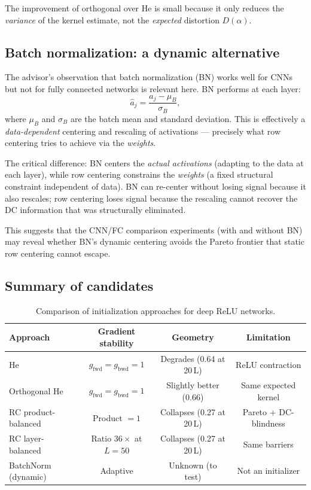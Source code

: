 \documentclass[11pt,a4paper]{article}
\theoremstyle{definition}
\begin{document}
The improvement of orthogonal over He is small because it only reduces
the \emph{variance} of the kernel estimate, not the \emph{expected}
distortion $D(\alpha)$.

\subsection{Batch normalization: a dynamic alternative}

The advisor's observation that batch normalization (BN) works well for
CNNs but not for fully connected networks is relevant here.  BN performs
at each layer:
\[
  \hat{a}_j = \frac{a_j - \mu_B}{\sigma_B},
\]
where $\mu_B$ and $\sigma_B$ are the batch mean and standard deviation.
This is effectively a \emph{data-dependent} centering and rescaling of
activations --- precisely what row centering tries to achieve via the
\emph{weights}.

The critical difference: BN centers the \emph{actual activations}
(adapting to the data at each layer), while row centering constrains
the \emph{weights} (a fixed structural constraint independent of data).
BN can re-center without losing signal because it also rescales;
row centering loses signal because the rescaling cannot recover the
DC information that was structurally eliminated.

This suggests that the CNN/FC comparison experiments (with and without BN)
may reveal whether BN's dynamic centering avoids the Pareto frontier
that static row centering cannot escape.

\subsection{Summary of candidates}

\begin{table}[H]
\centering
\caption{Comparison of initialization approaches for deep ReLU networks.}
\label{tab:candidates}
\begin{tabular}{l c c c}
\toprule
Approach & Gradient stability & Geometry & Limitation \\
\midrule
He                    & $g_{\mathrm{fwd}} = g_{\mathrm{bwd}} = 1$ & Degrades (0.64 at 20\,L) & ReLU contraction \\
Orthogonal He         & $g_{\mathrm{fwd}} = g_{\mathrm{bwd}} = 1$ & Slightly better (0.66)    & Same expected kernel \\
RC product-balanced   & Product $= 1$                              & Collapses (0.27 at 20\,L) & Pareto + DC-blindness \\
RC layer-balanced     & Ratio $36\times$ at $L\!=\!50$             & Collapses (0.27 at 20\,L) & Same barriers \\
BatchNorm (dynamic)   & Adaptive                                   & Unknown (to test)         & Not an initializer \\
\bottomrule
\end{tabular}
\end{table}
\end{document}
